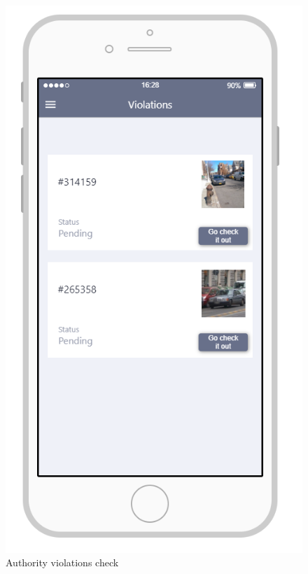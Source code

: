 \documentclass{article}
\begin{document}
\begin{figure}[H]
    \centering
    \includegraphics[scale=0.7]{Images/ViolationsAPP}
    \caption{Authority violations check}
\end{figure}
\end{document}
